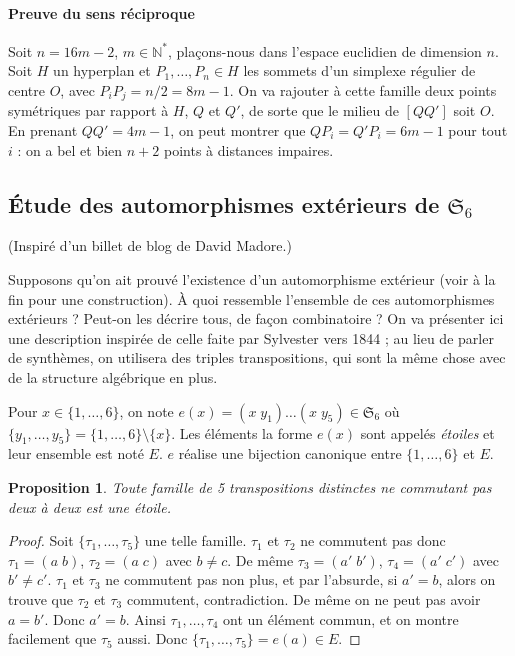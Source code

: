\documentclass[a4paper, 11pt]{article}
\def\N{\mathbb{N}}
\def\Sigmap{\mathfrak{S}}
\newtheorem*{proposition}{Proposition}
\begin{document}
\paragraph{Preuve du sens réciproque}

Soit $n = 16m - 2$, $m \in \N^*$, plaçons-nous dans l'espace euclidien de
dimension $n$. Soit $H$ un hyperplan et $P_1, \ldots, P_n \in H$ les sommets
d'un simplexe régulier de centre $O$, avec $P_iP_j = n/2 = 8m-1$. On va rajouter
à cette famille deux points symétriques par rapport à $H$, $Q$ et $Q'$, de sorte
que le milieu de $[QQ']$ soit $O$. En prenant $QQ' = 4m - 1$, on peut montrer
que $QP_i = Q'P_i = 6m - 1$ pour tout $i$ : on a bel et bien $n+2$ points à
distances impaires.


\newpage


\subsection{Étude des automorphismes extérieurs de $\Sigmap_6$}

(Inspiré d'un billet de blog de David Madore.)

Supposons qu'on ait prouvé l'existence d'un automorphisme extérieur (voir à la
fin pour une construction). À quoi ressemble l'ensemble de ces automorphismes
extérieurs ? Peut-on les décrire tous, de façon combinatoire ? On va présenter
ici une description inspirée de celle faite par Sylvester vers 1844 ; au lieu de
parler de synthèmes, on utilisera des triples transpositions, qui sont la même
chose avec de la structure algébrique en plus.

Pour $x \in \{1, \ldots, 6\}$, on note $e(x) = (x\;y_1)\ldots(x\;y_5) \in
\Sigmap_6$ où $\{ y_1, \ldots, y_5 \} = \{1, \ldots, 6\}\setminus\{x\}$. Les
éléments la forme $e(x)$ sont appelés \emph{étoiles} et leur ensemble est noté
$E$. $e$ réalise une bijection canonique entre $\{1, \ldots, 6\}$ et $E$.

\begin{proposition}
  Toute famille de 5 transpositions distinctes ne commutant pas deux à deux est
  une étoile.
\end{proposition}
\begin{proof}
  Soit $\{\tau_1, \ldots, \tau_5\}$ une telle famille. $\tau_1$ et $\tau_2$ ne
  commutent pas donc $\tau_1 = (a\;b)$, $\tau_2 = (a\;c)$ avec $b \neq c$. De
  même $\tau_3 = (a'\;b')$, $\tau_4 = (a'\;c')$ avec $b' \neq c'$. $\tau_1$ et
  $\tau_3$ ne commutent pas non plus, et par l'absurde, si $a' = b$, alors on
  trouve que $\tau_2$ et $\tau_3$ commutent, contradiction. De même on ne peut
  pas avoir $a = b'$. Donc $a' = b$. Ainsi $\tau_1, \ldots, \tau_4$ ont un
  élément commun, et on montre facilement que $\tau_5$ aussi. Donc $\{\tau_1,
  \ldots, \tau_5\} = e(a) \in E$.
\end{proof}
\end{document}
